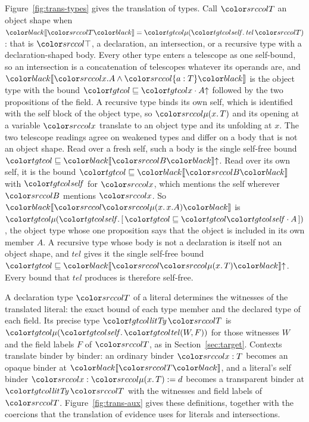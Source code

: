Figure~\ref{fig:trans-types} gives the translation of types. Call $\src{T}$ an object shape when $\trans{T} = \obj{\mathit{tel}\,\src{T}}$: that is $\src{\top}$, a declaration, an intersection, or a recursive type with a declaration-shaped body. Every other type enters a telescope as one self-bound, so an intersection is a concatenation of telescopes whatever its operands are, and $\trans{x.A \wedge \dfld{a}{T}}$ is the object type with the bound $\pbnd{\weak{\sel{x}{A}}}$ followed by the two propositions of the field. A recursive type binds its own self, which is identified with the self block of the object type, so $\dmu{x}{T}$ and its opening at a variable $\src{x}$ translate to an object type and its unfolding at $x$. The two telescope readings agree on weakened types and differ on a body that is not an object shape. Read over a fresh self, such a body is the single self-free bound $\pbnd{\weak{\trans{B}}}$. Read over its own self, it is the bound $\pbnd{\trans{B}}$ with $\self$ for $\src{x}$, which mentions the self wherever $\src{B}$ mentions $\src{x}$. So $\trans{\dmu{x}{x.A}}$ is $\obj{[\,\pbnd{\sel{\self}{A}}\,]}$, the object type whose one proposition says that the object is included in its own member $A$. A recursive type whose body is not a declaration is itself not an object shape, and $\mathit{tel}$ gives it the single self-free bound $\pbnd{\weak{\trans{\dmu{x}{T}}}}$. Every bound that $\mathit{tel}$ produces is therefore self-free.

A declaration type $\src{T}$ of a literal determines the witnesses of the translated literal: the exact bound of each type member and the declared type of each field. Its precise type $\tgt{\mathit{litTy}}\,\src{T}$ is $\obj{\ofLit{W}{F}}$ for those witnesses $W$ and the field labels $F$ of $\src{T}$, as in Section~\ref{sec:target}. Contexts translate binder by binder: an ordinary binder $\src{x : T}$ becomes an opaque binder at $\trans{T}$, and a literal's self binder $\src{x : \dmu{x}{T} \mathrel{:=} d}$ becomes a transparent binder at $\tgt{\mathit{litTy}}\,\src{T}$ with the witnesses and field labels of $\src{T}$. Figure~\ref{fig:trans-aux} gives these definitions, together with the coercions that the translation of evidence uses for literals and intersections.

